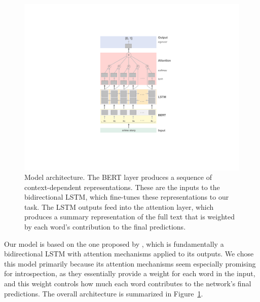 \documentclass[11pt,a4paper]{article}
\begin{document}
\begin{figure}[th]
  \includegraphics[width=1\linewidth]{graphs/model.pdf}
  \caption{Model architecture. The BERT layer produces
    a sequence of context-dependent representations. These
    are the inputs to the bidirectional LSTM, which
    fine-tunes these representations to our task.
    The LSTM outputs feed into the attention layer,
    which produces a summary representation of the full
    text that is weighted by each word's contribution
    to the final predictions.}
  \label{fig:model}
\end{figure}

Our model is based on the one proposed by \citeauthor{Lin:2017}, which is fundamentally a  bidirectional LSTM with attention mechanisms applied to its outputs. We chose this model primarily because its attention mechanisms seem especially promising for introspection, as they essentially provide a weight for each word in the input, and this weight controls how much each word contributes to the network's final predictions. The overall architecture is summarized in Figure~\ref{fig:model}.

\end{document}
